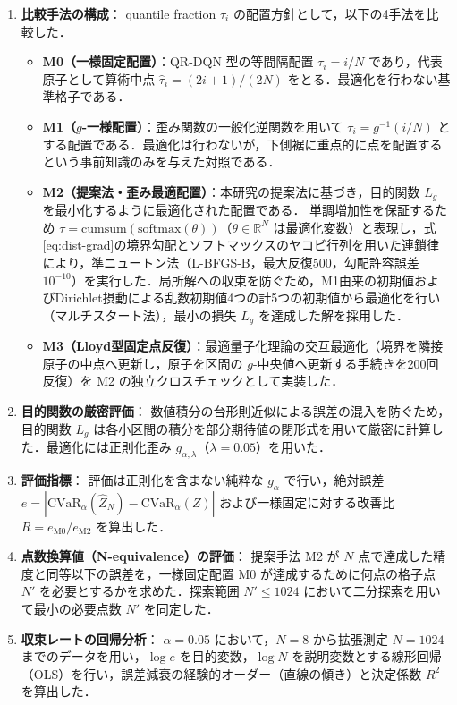 \documentclass[a4paper,10pt]{jsarticle}
\theoremstyle{definition}
\newcommand{\CVaR}{\mathrm{CVaR}}
\newcommand{\R}{\mathbb{R}}
\begin{document}
\begin{enumerate}
  \item \textbf{比較手法の構成}：
  quantile fraction $\tau_i$ の配置方針として，以下の4手法を比較した．
  \begin{itemize}
    \item \textbf{M0（一様固定配置）}：QR-DQN 型の等間隔配置 $\tau_i = i/N$ であり，代表原子として算術中点 $\hat\tau_i = (2i+1)/(2N)$ をとる．最適化を行わない基準格子である．
    \item \textbf{M1（$g$-一様配置）}：歪み関数の一般化逆関数を用いて $\tau_i = g^{-1}(i/N)$ とする配置である．最適化は行わないが，下側裾に重点的に点を配置するという事前知識のみを与えた対照である．
    \item \textbf{M2（提案法・歪み最適配置）}：本研究の提案法に基づき，目的関数 $L_g$ を最小化するように最適化された配置である．
    単調増加性を保証するため $\tau = \mathrm{cumsum}(\mathrm{softmax}(\theta))$（$\theta \in \R^N$ は最適化変数）と表現し，式\eqref{eq:dist-grad}の境界勾配とソフトマックスのヤコビ行列を用いた連鎖律により，準ニュートン法（L-BFGS-B，最大反復500，勾配許容誤差 $10^{-10}$）を実行した．局所解への収束を防ぐため，M1由来の初期値およびDirichlet摂動による乱数初期値4つの計5つの初期値から最適化を行い（マルチスタート法），最小の損失 $L_g$ を達成した解を採用した．
    \item \textbf{M3（Lloyd型固定点反復）}：最適量子化理論の交互最適化（境界を隣接原子の中点へ更新し，原子を区間の $g$-中央値へ更新する手続きを200回反復）を M2 の独立クロスチェックとして実装した．
  \end{itemize}

  \item \textbf{目的関数の厳密評価}：
  数値積分の台形則近似による誤差の混入を防ぐため，目的関数 $L_g$ は各小区間の積分を部分期待値の閉形式を用いて厳密に計算した．最適化には正則化歪み $g_{\alpha,\lambda}$（$\lambda=0.05$）を用いた．

  \item \textbf{評価指標}：
  評価は正則化を含まない純粋な $g_\alpha$ で行い，絶対誤差 $e = |\CVaR_\alpha(\hat Z_N) - \CVaR_\alpha(Z)|$ および一様固定に対する改善比 $R = e_{\mathrm{M0}} / e_{\mathrm{M2}}$ を算出した．

  \item \textbf{点数換算値（N-equivalence）の評価}：
  提案手法 M2 が $N$ 点で達成した精度と同等以下の誤差を，一様固定配置 M0 が達成するために何点の格子点 $N'$ を必要とするかを求めた．探索範囲 $N' \le 1024$ において二分探索を用いて最小の必要点数 $N'$ を同定した．

  \item \textbf{収束レートの回帰分析}：
  $\alpha=0.05$ において，$N=8$ から拡張測定 $N=1024$ までのデータを用い，$\log e$ を目的変数，$\log N$ を説明変数とする線形回帰（OLS）を行い，誤差減衰の経験的オーダー（直線の傾き）と決定係数 $R^2$ を算出した．


\end{enumerate}
\end{document}
